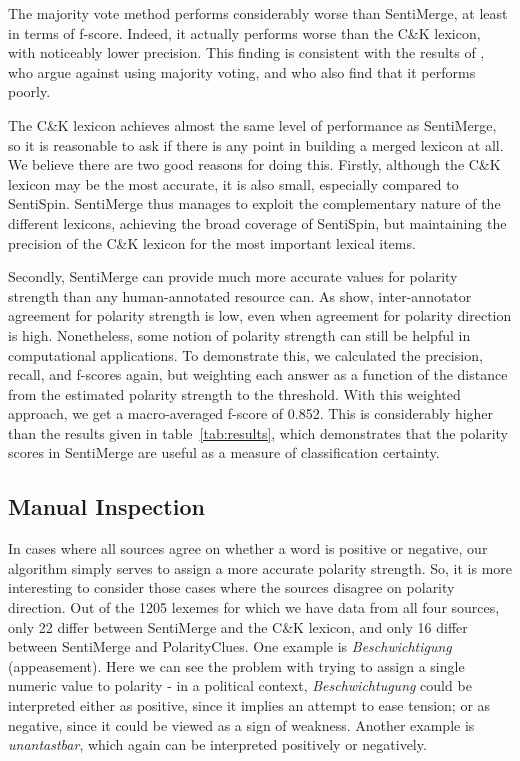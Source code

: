 \documentclass[11pt]{article}
\begin{document}
The majority vote method performs considerably worse than SentiMerge, at least in terms of f-score. Indeed, it actually performs worse than the C\&K lexicon, with noticeably lower precision. This finding is consistent with the results of , who argue against using majority voting, and who also find that it performs poorly.

The C\&K lexicon achieves almost the same level of performance as SentiMerge, so it is reasonable to ask if there is any point in building a merged lexicon at all. We believe there are two good reasons for doing this. Firstly, although the C\&K lexicon may be the most accurate, it is also small, especially compared to SentiSpin.  SentiMerge thus manages to exploit the complementary nature of the different lexicons, achieving the broad coverage of SentiSpin, but maintaining the precision of the C\&K lexicon for the most important lexical items.

Secondly, SentiMerge can provide much more accurate values for polarity strength than any human-annotated resource can. As  show, inter-annotator agreement for polarity strength is low, even when agreement for polarity direction is high.  Nonetheless, some notion of polarity strength can still be helpful in computational applications.  To demonstrate this, we calculated the precision, recall, and f-scores again, but weighting each answer as a function of the distance from the estimated polarity strength to the threshold.  With this weighted approach, we get a macro-averaged f-score of 0.852.  This is considerably higher than the results given in table~\ref{tab:results}, which demonstrates that the polarity scores in SentiMerge are useful as a measure of classification certainty.


\subsection{Manual Inspection}

In cases where all sources agree on whether a word is positive or negative, our algorithm simply serves to assign a more accurate polarity strength. So, it is more interesting to consider those cases where the sources disagree on polarity direction. Out of the 1205 lexemes for which we have data from all four sources, only 22 differ between SentiMerge and the C\&K lexicon, and only 16 differ between SentiMerge and PolarityClues.  One example is \emph{Beschwichtigung} (appeasement). Here we can see the problem with trying to assign a single numeric value to polarity - in a political context, \emph{Beschwichtugung} could be interpreted either as positive, since it implies an attempt to ease tension; or as negative, since it could be viewed as a sign of weakness.  Another example is \emph{unantastbar}, which again can be interpreted positively or negatively.
\end{document}
